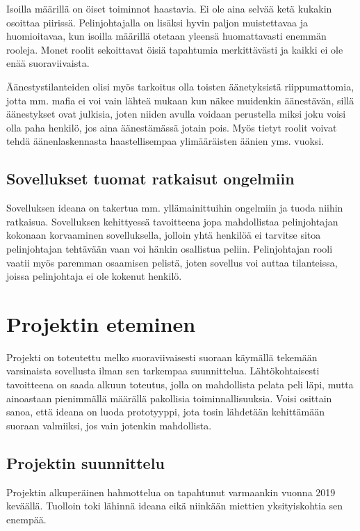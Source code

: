Isoilla määrillä on öiset toiminnot haastavia. Ei ole aina selvää ketä kukakin
osoittaa piirissä. Pelinjohtajalla on lisäksi hyvin paljon muistettavaa ja
huomioitavaa, kun isoilla määrillä otetaan yleensä huomattavasti enemmän
rooleja. Monet roolit sekoittavat öisiä tapahtumia merkittävästi ja kaikki
ei ole enää suoraviivaista.

Äänestystilanteiden olisi myös tarkoitus olla toisten äänetyksistä
riippumattomia, jotta mm. mafia ei voi vain lähteä mukaan kun näkee
muidenkin äänestävän, sillä äänestykset ovat julkisia, joten niiden avulla
voidaan perustella miksi joku voisi olla paha henkilö, jos aina äänestämässä
jotain pois. Myös tietyt roolit voivat tehdä äänenlaskennasta haastellisempaa
ylimääräisten äänien yms. vuoksi.

\subsection{Sovellukset tuomat ratkaisut ongelmiin}

Sovelluksen ideana on takertua mm. yllämainittuihin ongelmiin ja tuoda niihin
ratkaisua. Sovelluksen kehittyessä tavoitteena jopa mahdollistaa pelinjohtajan
kokonaan korvaaminen sovelluksella, jolloin yhtä henkilöä ei tarvitse sitoa
pelinjohtajan tehtävään vaan voi hänkin osallistua peliin. Pelinjohtajan rooli
vaatii myös paremman osaamisen pelistä, joten sovellus voi auttaa tilanteissa,
joissa pelinjohtaja ei ole kokenut henkilö.

\section{Projektin eteminen}

Projekti on toteutettu melko suoraviivaisesti suoraan käymällä tekemään
varsinaista sovellusta ilman sen tarkempaa suunnittelua. Lähtökohtaisesti
tavoitteena on saada alkuun toteutus, jolla on mahdollista pelata peli läpi,
mutta ainoastaan pienimmällä määrällä pakollisia toiminnallisuuksia. Voisi
osittain sanoa, että ideana on luoda prototyyppi, jota tosin lähdetään
kehittämään suoraan valmiiksi, jos vain jotenkin mahdollista.

\subsection{Projektin suunnittelu}

Projektin alkuperäinen hahmottelua on tapahtunut varmaankin vuonna 2019
keväällä. Tuolloin toki lähinnä ideana eikä niinkään miettien yksityiskohtia
sen enempää.


